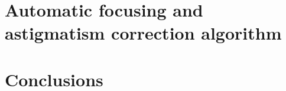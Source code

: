 \documentclass[12pt, conference]{IEEEtran}
\begin{document}




\section{Automatic focusing and astigmatism correction algorithm}
\label{Section correction algorithm}

\section{Conclusions}
\end{document}
